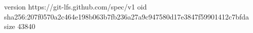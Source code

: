 version https://git-lfs.github.com/spec/v1
oid sha256:207f0570a2c464e198b063b7fb236a27a9c947580d17e3847f59901412c7bfda
size 43840
